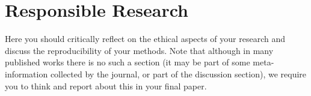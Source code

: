 \section{Responsible Research}
Here you should critically reflect on the ethical aspects of your research and discuss the reproducibility of your methods. Note that although in many published works there is no such a section (it may be part of some meta-information collected by the journal, or part of the discussion section), we require you to think and report about this in your final paper.